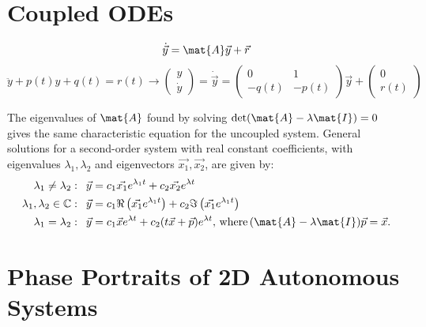 \documentclass[10pt, a4paper]{article}
\begin{document}


\begin{landscape}
\begin{multicols}{2}
    \raggedcolumns

    \section{Coupled ODEs}

    \[\dot{\vec{y}} = \mat{A} \vec{y} + \vec{r}\]
    \[
        \ddot y + p(t) y + q(t) = r(t) \longrightarrow
        \begin{pmatrix}
            y \\
            \dot y
        \end{pmatrix}
        = \dot{\vec{y}} = \begin{pmatrix}
            0 & 1 \\
            -q(t) & -p(t)
        \end{pmatrix} \vec{y} + \begin{pmatrix}
            0 \\
            r(t)
        \end{pmatrix}
    \]

    The eigenvalues of \(\mat{A}\) found by solving \(\det (\mat{A} - \lambda \mat{I}) = 0\)
    gives the same characteristic equation for the uncoupled system. General solutions for
    a second-order system with real constant coefficients, with
    eigenvalues \(\lambda_1, \lambda_2\) and eigenvectors \(\vec{x_1}, \vec{x_2}\), are given by:
    \begin{align*}
        \lambda_1 \neq \lambda_2: \enspace
            \vec{y} &= c_1 \vec{x_1} e^{\lambda_1 t} + c_2 \vec{x_2} e^{\lambda t} \\
        \lambda_1, \lambda_2 \in \mathbb{C}: \enspace
            \vec{y} &= c_1 \Re\left(\vec{x_1} e^{\lambda_1 t}\right) 
                + c_2 \Im\left(\vec{x_1} e^{\lambda_1 t}\right) \\
        \lambda_1 = \lambda_2: \enspace
            \vec{y} &= c_1 \vec{x} e^{\lambda t} + c_2 (t \vec{x} + \vec{p}) e^{\lambda t},
            \,\text{where}\, (\mat{A} - \lambda \mat{I}) \vec{p} = \vec{x}.
    \end{align*}

    \section{Phase Portraits of 2D Autonomous Systems}


\end{multicols}
\end{landscape}
\end{document}
